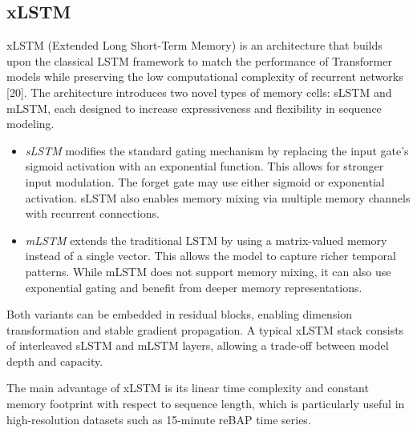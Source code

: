 \documentclass[class=scrbook, crop=false]{standalone}
\begin{document}


\subsection{xLSTM}
\label{Section::xLSTM}
xLSTM (Extended Long Short-Term Memory) is an architecture that builds upon the classical LSTM framework to match the performance of Transformer models while preserving the low computational complexity of recurrent networks [20]. The architecture introduces two novel types of memory cells: sLSTM and mLSTM, each designed to increase expressiveness and flexibility in sequence modeling.
\begin{itemize}
\item \textit{sLSTM} modifies the standard gating mechanism by replacing the input gate's sigmoid activation with an exponential function. This allows for stronger input modulation. The forget gate may use either sigmoid or exponential activation. sLSTM also enables memory mixing via multiple memory channels with recurrent connections.
\item \textit{mLSTM} extends the traditional LSTM by using a matrix-valued memory instead of a single vector. This allows the model to capture richer temporal patterns. While mLSTM does not support memory mixing, it can also use exponential gating and benefit from deeper memory representations.
\end{itemize}

Both variants can be embedded in residual blocks, enabling dimension transformation and stable gradient propagation. A typical xLSTM stack consists of interleaved sLSTM and mLSTM layers, allowing a trade-off between model depth and capacity.

The main advantage of xLSTM is its linear time complexity and constant memory footprint with respect to sequence length, which is particularly useful in high-resolution datasets such as 15-minute reBAP time series.


\end{document}
